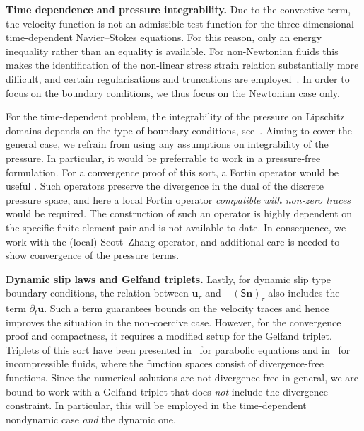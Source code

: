 \documentclass[reqno,a4paper]{amsart}
\def\tens#1{\pmb{\mathsf{#1}}}
\def\vec#1{\boldsymbol{#1}}
\def\bn{\vec{n}}
\def\bu{\vec{u}}
\def\BS{\tens{S}}
\begin{document}
	\textbf{Time dependence and pressure integrability.} 
	Due to the convective term, the velocity function is not an admissible test function for the three dimensional time-dependent Navier--Stokes equations. 
	For this reason, only an energy inequality rather than an equality is available. 
	For non-Newtonian fluids this makes the identification of the non-linear stress strain relation substantially more difficult, and certain regularisations and truncations are employed~\cite{DieningRuzickaWolf2010,BulicekGwiazdaMalekEtAl2012}. 
	In order to focus on the boundary conditions, we thus focus on  the Newtonian case only.
	
	
	For the time-dependent problem, the integrability of the pressure on Lipschitz domains depends on the type of boundary conditions, see~\cite{BulicekMalek2016}. 
	Aiming to cover the general case, we refrain from using any assumptions on integrability of the pressure. In particular, it would be preferrable to work in a pressure-free formulation. 
	For a convergence proof of this sort, a Fortin operator would be useful \cite{DieningKreuzerSueli2013,SueliTscherpel2020}. 
	Such operators preserve the divergence in the dual of the discrete pressure space, and here a local Fortin operator \emph{compatible with non-zero traces} would be required. 
	The construction of such an operator is highly dependent on the specific finite element pair and is not available to date. 
	In consequence, we work with the (local) Scott--Zhang operator, and additional  care is needed to show convergence of the pressure terms. 
	\medskip 
	
	\textbf{Dynamic slip laws and Gelfand triplets.} Lastly,  for dynamic slip type boundary conditions, the relation between $\bu_\tau$ and $-(\BS\bn)_{\tau}$ also includes the term $\partial_t \bu$. 
	Such a term guarantees bounds on the velocity traces and hence improves the situation in the non-coercive case. 
	However, for the convergence proof and compactness, it requires a modified setup for the Gelfand triplet. 
	Triplets of this sort have been  presented in~\cite{Kovacs2017} for parabolic equations and in~\cite{Abbatiello2021} for incompressible fluids, {where} the function spaces consist of  divergence-free functions. 
	Since the numerical solutions are not divergence-free in general, we are bound to work with a Gelfand triplet that does \emph{not} include the divergence-constraint. In particular, this will be employed in the time-dependent nondynamic case \emph{and} the dynamic one. 
	
\end{document}

